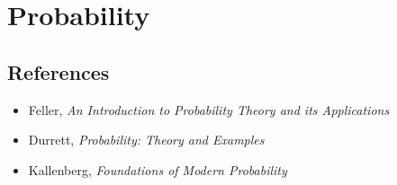 \section{Probability}
\subsection*{References}
\begin{itemize}
    \item Feller, \emph{An Introduction to Probability Theory and its
        Applications}
    \item Durrett, \emph{Probability: Theory and Examples}
    \item Kallenberg, \emph{Foundations of Modern Probability}
\end{itemize}
